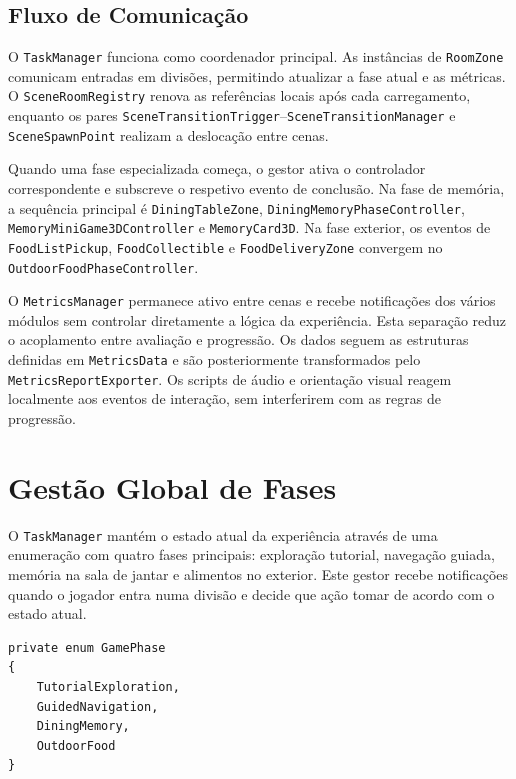 \documentclass[12pt,a4paper,oneside]{report}
\begin{document}
\subsection{Fluxo de Comunicação}

O \texttt{TaskManager} funciona como coordenador principal. As instâncias de \texttt{RoomZone} comunicam entradas em divisões, permitindo atualizar a fase atual e as métricas. O \texttt{SceneRoomRegistry} renova as referências locais após cada carregamento, enquanto os pares \texttt{SceneTransitionTrigger}--\texttt{SceneTransitionManager} e \texttt{SceneSpawnPoint} realizam a deslocação entre cenas.

Quando uma fase especializada começa, o gestor ativa o controlador correspondente e subscreve o respetivo evento de conclusão. Na fase de memória, a sequência principal é \texttt{DiningTableZone}, \texttt{DiningMemoryPhaseController}, \texttt{MemoryMiniGame3DController} e \texttt{MemoryCard3D}. Na fase exterior, os eventos de \texttt{FoodListPickup}, \texttt{FoodCollectible} e \texttt{FoodDeliveryZone} convergem no \texttt{OutdoorFoodPhaseController}.

O \texttt{MetricsManager} permanece ativo entre cenas e recebe notificações dos vários módulos sem controlar diretamente a lógica da experiência. Esta separação reduz o acoplamento entre avaliação e progressão. Os dados seguem as estruturas definidas em \texttt{MetricsData} e são posteriormente transformados pelo \texttt{MetricsReportExporter}. Os scripts de áudio e orientação visual reagem localmente aos eventos de interação, sem interferirem com as regras de progressão.

\section{Gestão Global de Fases}

O \texttt{TaskManager} mantém o estado atual da experiência através de uma enumeração com quatro fases principais: exploração tutorial, navegação guiada, memória na sala de jantar e alimentos no exterior. Este gestor recebe notificações quando o jogador entra numa divisão e decide que ação tomar de acordo com o estado atual.

\begin{lstlisting}[language=CSharp,caption={Estados principais da experiência}]
private enum GamePhase
{
    TutorialExploration,
    GuidedNavigation,
    DiningMemory,
    OutdoorFood
}
\end{lstlisting}
\end{document}
